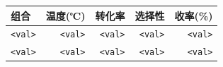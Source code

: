 \begin{tabular}{lrrrr}
\toprule
\textbf{组合} & \textbf{温度(℃)} & \textbf{转化率} & \textbf{选择性} & \textbf{收率(\%)} \\\midrule
\texttt{<val>} & \texttt{<val>} & \texttt{<val>} & \texttt{<val>} & \texttt{<val>} \\
\texttt{<val>} & \texttt{<val>} & \texttt{<val>} & \texttt{<val>} & \texttt{<val>} \\\bottomrule
\end{tabular}
